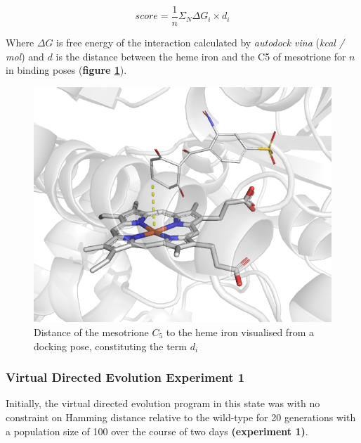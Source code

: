\documentclass{article}
\begin{document}
\begin{equation}\label{eqn}
	score = \frac{1}{n}\Sigma _{N} \Delta G_{i} \times d_{i}
\end{equation}


Where $ \Delta G $ is free energy of the interaction calculated by \textit{autodock vina} (\textit{kcal / mol}) and $ d $ is the distance between the heme iron and the C5 of mesotrione for $ n $ in binding poses (\textbf{figure \ref{score}}).


\begin{figure}[H]
	\includegraphics[width=\textwidth]{figs/score.png}
	\caption{\textbf{\label{score}} Distance of the mesotrione $C_5$ to the heme iron visualised from a docking pose, constituting the term $d_i$}
\end{figure}
\par
\subsubsection{Virtual Directed Evolution Experiment 1}
Initially, the virtual directed evolution program in this state was with no constraint on Hamming distance relative to the wild-type for 20 generations with a population size of 100 over the course of two days \textbf{(experiment 1)}. 
\end{document}

